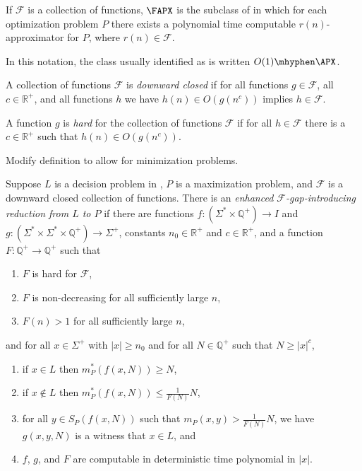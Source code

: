 \documentclass{article}
\begin{document}
\begin{definition}
  If $\mathcal{F}$ is a collection of functions, $\FAPX$ is the subclass of \NPO{} in which for each optimization problem $P$ there exists a polynomial time computable $r(n)$-approximator for $P$, where $r(n) \in \mathcal{F}$.
\end{definition}

In this notation, the class usually identified as \APX{} is written $O(1)\mhyphen\APX$.

\begin{definition}\label{def:downwardclosed}
  A collection of functions $\mathcal{F}$ is \emph{downward closed} if for all functions $g \in \mathcal{F}$, all $c \in \mathbb{R}^+$, and all functions $h$ we have $h(n) \in O(g(n^c))$ implies $h \in \mathcal{F}$.
\end{definition}

\begin{definition}\label{def:hardfunction}
  A function $g$ is \emph{hard} for the collection of functions $\mathcal{F}$ if for all $h \in \mathcal{F}$ there is a $c \in \mathbb{R}^+$ such that $h(n) \in O(g(n^c))$.
\end{definition}

\begin{todo}
  Modify definition to allow for minimization problems.
\end{todo}

\begin{definition}\label{def:gapintroducing}
  Suppose $L$ is a decision problem in \NP, $P$ is a maximization problem, and $\mathcal{F}$ is a downward closed collection of functions.
  There is an \emph{enhanced $\mathcal{F}$-gap-introducing reduction from $L$ to $P$} if there are functions $f \colon \left(\Sigma^* \times \mathbb{Q}^+ \right) \to I$ and $g \colon \left( \Sigma^* \times \Sigma^* \times \mathbb{Q}^+\right) \to \Sigma^+$, constants $n_0 \in \mathbb{R}^+$ and $c \in \mathbb{R}^+$, and a function $F \colon \mathbb{Q}^+ \to \mathbb{Q}^+$ such that
  \begin{enumerate}
  \item $F$ is hard for $\mathcal{F}$,
  \item $F$ is non-decreasing for all sufficiently large $n$,
  \item $F(n) > 1$ for all sufficiently large $n$,
  \end{enumerate}
  and for all $x \in \Sigma^+$ with $|x| \geq n_0$ and for all $N \in \mathbb{Q}^+$ such that $N \geq |x|^c$,
  \begin{enumerate}
  \item if $x \in L$ then $m_P^*(f(x, N)) \geq N$,
  \item if $x \notin L$ then $m_P^*(f(x, N)) \leq \frac{1}{F(N)} N$,
  \item for all $y \in S_P(f(x, N))$ such that $m_P(x, y) > \frac{1}{F(N)} N$, we have $g(x, y, N)$ is a witness that $x \in L$, and
  \item $f$, $g$, and $F$ are computable in deterministic time polynomial in $|x|$.
  \end{enumerate}
\end{definition}
\end{document}
